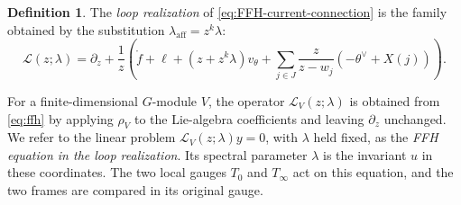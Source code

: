 \documentclass[11pt,leqno]{amsart}
\numberwithin{equation}{section}
\theoremstyle{plain}
\theoremstyle{definition}
\newtheorem{definition}[theorem]{Definition}
\theoremstyle{plain}
\theoremstyle{definition}
\theoremstyle{remark}
\begin{document}
\begin{definition}\label{def:FFH-loop-realization}
The \emph{loop realization} of \eqref{eq:FFH-current-connection} is the family obtained by the substitution $\lambda_{\mathrm{aff}}=z^k\lambda$:
\begin{equation}\label{eq:ffh}
 \mathcal L(z;\lambda)
 =\partial_z+\frac1z
 \left(
 \mathring f+\ell+(z+z^k\lambda)v_\theta
 +\sum_{j\in J}\frac{z}{z-w_j}
       \left(-\theta^\vee+X(j)\right)
 \right).
\end{equation}
\end{definition}
For a finite-dimensional $G$-module $V$, the operator $\mathcal L_V(z;\lambda)$ is obtained from \eqref{eq:ffh} by applying $\rho_V$ to the Lie-algebra coefficients and leaving $\partial_z$ unchanged.  We refer to the linear problem $\mathcal L_V(z;\lambda)y=0$, with $\lambda$ held fixed, as the \emph{FFH equation in the loop realization}.  Its spectral parameter $\lambda$ is the invariant $u$ in these coordinates.  The two local gauges $T_0$ and $T_\infty$ act on this equation, and the two frames are compared in its original gauge.
\end{document}
